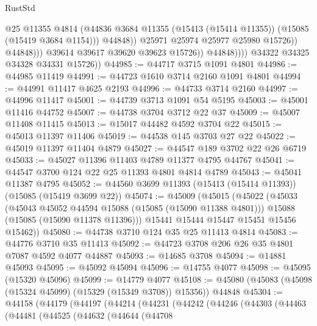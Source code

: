 \begin{lexlean}{RustStd}
\begin{coremodule}
                                  @25
                                  @11355
                                  @4814
                                  (@44836
                                    @3684
                                    @11355
                                    (@15413 (@15414 @11355))
                                    (@15085 (@15419 @3684 @1154)))
                                  @44848))
                              @25971
                              @25974
                              @25977
                              @25980
                              @15726))
                          @44848)))
                    @39614
                    @39617
                    @39620
                    @39623
                    @15726))
                @44848))))
        @34322
        @34325
        @34328
        @34331
        @15726))
@44985 := @44717 @3715 @1091 @4801
@44986 := @44985 @11419
@44991 := @44723 @1610 @3714 @2160 @1091 @4801
@44994 := @44991 @11417 @4625 @2193
@44996 := @44733 @3714 @2160
@44997 := @44996 @11417
@45001 := @44739 @3713 @1091 @54 @5195
@45003 := @45001 @11416 @44752
@45007 := @44738 @3704 @3712 @22 @37
@45009 := @45007 @11408 @11415
@45013 := @15017 @44482 @4592 @3704 @22
@45015 := @45013 @11397 @11406
@45019 := @44538 @145 @3703 @27 @22
@45022 := @45019 @11397 @11404 @4879
@45027 := @44547 @189 @3702 @22 @26 @6719
@45033 := @45027 @11396 @11403 @4789 @11377 @4795 @44767
@45041 := @44547 @3700 @124 @22 @25 @11393 @4801 @4814 @4789
@45043 := @45041 @11387 @4795
@45052 := @44560 @3699 @11393 (@15413 (@15414 @11393)) (@15085 (@15419 @3699 @22))
@45074 := @45009
    (@45015
      (@45022
        (@45033
          (@45043 @45052 @44594 @15088 (@15085 (@15090 @11388 @4801)))
          @15088
          (@15085 (@15090 @11378 @11396)))
        @15441
        @15444
        @15447
        @15451
        @15456
        @15462))
@45080 := @44738 @3710 @124 @35 @25 @11413 @4814
@45083 := @44776 @3710 @35 @11413
@45092 := @44723 @3708 @206 @26 @35 @4801 @7087 @4592 @4077 @44887
@45093 := @14685 @3708
@45094 := @14881 @45093
@45095 := @45092 @45094
@45096 := @14755 @4077
@45098 := @45095 (@15320 @45096)
@45099 := @14779 @4077
@45108 := @45080 (@45083 (@45098 (@15324 @45099) (@15329 (@15349 @3708)) @15356)) @44848
@45304 := @44158
    (@44179
      (@44197
        (@44214
          (@44231
            (@44242
              (@44246
                (@44303
                  (@44463
                    (@44481
                      (@44525
                        (@44632
                          (@44644
                            (@44708

\end{coremodule}
\end{lexlean}

